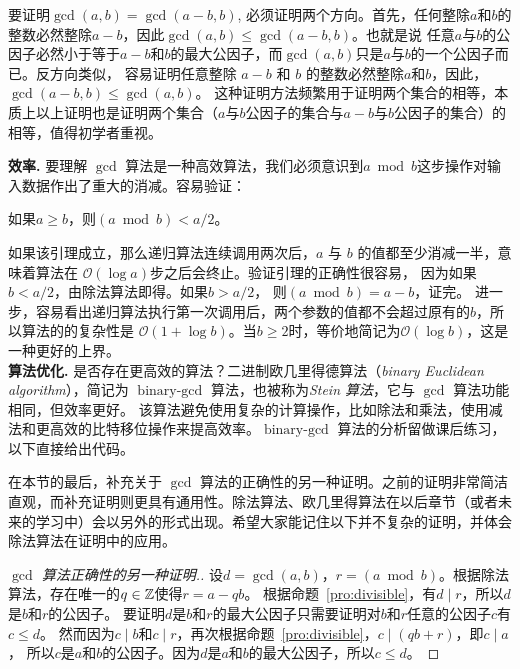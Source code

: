 要证明$\gcd(a, b) = \gcd(a - b, b)$, 必须证明两个方向。首先，任何整除$a$和$b$的整数必然整除$a - b$，因此$\gcd(a, b) \leq \gcd(a - b, b)$。也就是说
任意$a$与$b$的公因子必然小于等于$a-b$和$b$的最大公因子，而$\gcd(a, b)$只是$a$与$b$的一个公因子而已。反方向类似，
容易证明任意整除 $a - b$ 和 $b$ 的整数必然整除$a$和$b$，因此，$\gcd(a-b, b) \leq \gcd(a, b)$。 这种证明方法频繁用于证明两个集合的相等，本质上以上证明也是证明两个集合（$a$与$b$公因子的集合与$a-b$与$b$公因子的集合）的相等，值得初学者重视。

\noindent\textbf{效率.} 要理解 $\gcd$ 算法是一种高效算法，我们必须意识到$a \bmod b$这步操作对输入数据作出了重大的消减。容易验证：
\begin{lemma}{}{}
	如果$a \geq b$，则$(a \bmod b ) < a/2$。 
\end{lemma}
如果该引理成立，那么递归算法连续调用两次后，$a$ 与 $b$ 的值都至少消减一半，意味着算法在 $\mathcal{O}(\log a)$步之后会终止。验证引理的正确性很容易，
因为如果$b < a/2$，由除法算法即得。如果$b > a/2$， 则$(a \bmod b) = a - b$，证完。
进一步，容易看出递归算法执行第一次调用后，两个参数的值都不会超过原有的$b$，所以算法的的复杂性是 $\mathcal{O}(1 + \log b)$。当$b\geq 2$时，等价地简记为$\mathcal{O}(\log b)$，这是一种更好的上界。\\

\noindent\textbf{算法优化.} 是否存在更高效的算法？二进制欧几里得德算法（\emph{binary Euclidean algorithm}），简记为 $\operatorname{binary-gcd}$ 算法，也被称为\emph{Stein 算法}，它与 $\gcd$ 算法功能相同，但效率更好。
该算法避免使用复杂的计算操作，比如除法和乘法，使用减法和更高效的比特移位操作来提高效率。$\operatorname{binary-gcd}$ 算法的分析留做课后练习，以下直接给出代码。

\begin{center}
	
\end{center}

在本节的最后，补充关于 $\gcd$ 算法的正确性的另一种证明。之前的证明非常简洁直观，而补充证明则更具有通用性。除法算法、欧几里得算法在以后章节（或者未来的学习中）会以另外的形式出现。希望大家能记住以下并不复杂的证明，并体会除法算法在证明中的应用。
\begin{proof}[$\gcd$ 算法正确性的另一种证明.]
设$d = \gcd(a, b)$，$r = (a \bmod b)$。根据除法算法，存在唯一的$q\in {\mathbb Z}$使得$r = a - qb$。
根据命题~\ref{pro:divisible}，有$d \mid r$，所以$d$是$b$和$r$的公因子。
要证明$d$是$b$和$r$的最大公因子只需要证明对$b$和$r$任意的公因子$c$有$c \leq d$。
然而因为$c \mid b$和$c \mid r$，再次根据命题~\ref{pro:divisible}，$c \mid (qb + r)$，即$c\mid a$，
所以$c$是$a$和$b$的公因子。因为$d$是$a$和$b$的最大公因子，所以$c \leq d$。
\end{proof}


